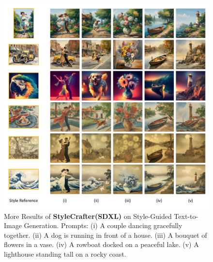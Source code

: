 \begin{figure}[p]
    \vspace*{\fill}
    \centering
    \includegraphics[width=\linewidth]{figures/supp/more_results_img_sdxl.pdf}
    \caption{More Results of \textbf{StyleCrafter(SDXL)} on Style-Guided Text-to-Image Generation. Prompts: (i) A couple dancing gracefully together. (ii) A dog is running in front of a house. (iii) A bouquet of flowers in a vase. (iv) A rowboat docked on a peaceful lake. (v) A lighthouse standing tall on a rocky coast.} 
    \label{fig:supp_more_result_img_sdxl}
    \vspace*{\fill}
\end{figure}


